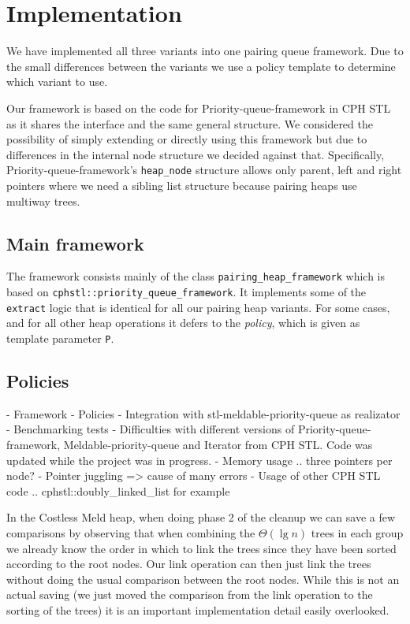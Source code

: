 \documentclass{DIKU-article}[2010/01/13]
\begin{document}
\section{Implementation}

We have implemented all three variants into one pairing queue framework. Due to
the small differences between the variants we use a policy template to determine
which variant to use. 

Our framework is based on the code for Priority-queue-framework in CPH STL as it
shares the interface and the same general structure. We considered the
possibility of simply extending or directly using this framework but due to
differences in the internal node structure we decided against that.
Specifically, Priority-queue-framework's \verb!heap_node! structure allows only
parent, left and right pointers where we need a sibling list structure because
pairing heaps use multiway trees.

\subsection{Main framework}

The framework consists mainly of the class \verb!pairing_heap_framework! which
is based on \verb!cphstl::priority_queue_framework!. It implements
some of the \verb!extract! logic that is identical for all our pairing heap
variants. For some cases, and for all other heap operations it defers to the
\emph{policy}, which is given as template parameter \verb!P!.

\subsection{Policies}

- Framework
- Policies
- Integration with stl-meldable-priority-queue as realizator
- Benchmarking tests
- Difficulties with different versions of Priority-queue-framework,
  Meldable-priority-queue and Iterator from CPH STL. Code was updated while the
  project was in progress.
- Memory usage .. three pointers per node?
- Pointer juggling => cause of many errors
- Usage of other CPH STL code .. cphstl::doubly\_linked\_list for example

In the Costless Meld heap, when doing phase 2 of the cleanup we can save a few
comparisons by observing that when combining the $\Theta(\lg n)$ trees in each
group we already know the order in which to link the trees since they have been
sorted according to the root nodes. Our link operation can then just link the
trees without doing the usual comparison between the root nodes. While this is
not an actual saving (we just moved the comparison from the link operation to
the sorting of the trees) it is an important implementation detail easily
overlooked.
\end{document}
